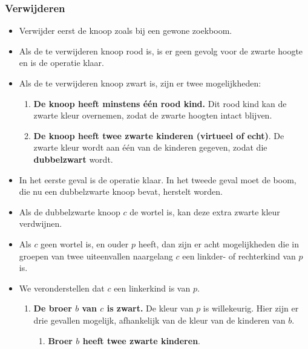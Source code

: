 \subsubsection{Verwijderen}
\begin{itemize}
    \item Verwijder eerst de knoop zoals bij een gewone zoekboom.
    \item Als de te verwijderen knoop rood is, is er geen gevolg voor de zwarte hoogte en is de operatie klaar.
    \item Als de te verwijderen knoop zwart is, zijn er twee mogelijkheden:
    \begin{enumerate}
        \item \textbf{De knoop heeft minstens één rood kind.} Dit rood kind kan de zwarte kleur overnemen, zodat de zwarte hoogten intact blijven.
        \item \textbf{De knoop heeft twee zwarte kinderen (virtueel of echt)}. De zwarte kleur wordt aan één van de kinderen gegeven, zodat die \textbf{dubbelzwart} wordt.
    \end{enumerate}
    \item In het eerste geval is de operatie klaar. In het tweede geval moet de boom, die nu een dubbelzwarte knoop bevat, herstelt worden.
    \item Als de dubbelzwarte knoop $c$ de wortel is, kan deze extra zwarte kleur verdwijnen. 
    \item Als $c$ geen wortel is, en ouder $p$ heeft, dan zijn er acht mogelijkheden die in groepen van twee uiteenvallen naargelang $c$ een linkder- of rechterkind van $p$ is.
    \item We veronderstellen dat $c$ een linkerkind is van $p$.
    \begin{enumerate}
        \item \textbf{De broer $b$ van $c$ is zwart.} De kleur van $p$ is willekeurig. Hier zijn er drie gevallen mogelijk, afhankelijk van de kleur van de kinderen van $b$.
        \begin{enumerate}
            \item \textbf{Broer $b$ heeft twee zwarte kinderen}.
            \begin{itemize}

\end{itemize}
\end{enumerate}
\end{enumerate}
\end{itemize}
